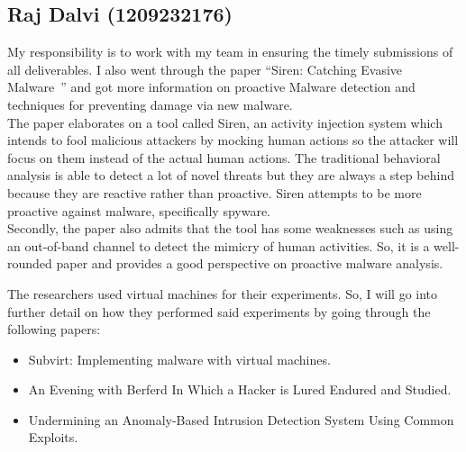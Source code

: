 \documentclass[11pt]{article}
\begin{document}
		\subsection{Raj Dalvi (1209232176)}
		My responsibility is to work with my team in ensuring the timely submissions of all deliverables. I also went through the paper “Siren: Catching Evasive Malware~\cite{borders2006siren}” and got more information on proactive Malware detection and techniques for preventing damage via new malware.\\
		The paper elaborates on a tool called Siren, an activity injection system which intends to fool malicious attackers by mocking human actions so the attacker will focus on them instead of the actual human actions. The traditional behavioral analysis is able to detect a lot of novel threats but they are always a step behind because they are reactive rather than proactive. Siren attempts to be more proactive against malware, specifically spyware.\\
		Secondly, the paper also admits that the tool has some weaknesses such as using an out-of-band channel to detect the mimicry of human activities. So, it is a well-rounded paper and provides a good perspective on proactive malware analysis.
		
		The researchers used virtual machines for their experiments. So, I will go into further detail on how they performed said experiments by going through the following papers:
		\begin{itemize}[noitemsep]
			\item Subvirt: Implementing malware with virtual machines.~\cite{king2006subvirt}
			\item An Evening with Berferd In Which a Hacker is Lured Endured and Studied.~\cite{cheswick1992evening}
			\item Undermining an Anomaly-Based Intrusion Detection System Using Common Exploits.~\cite{tan2002undermining}
		\end{itemize}
	
\end{document}
